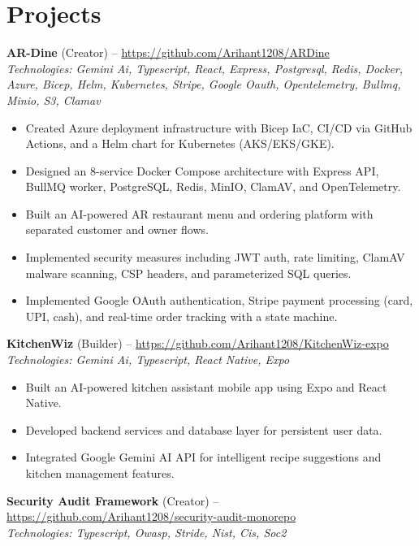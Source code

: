 \documentclass[11pt,a4paper]{article}
\begin{document}
\section{Projects}
\textbf{AR-Dine} (Creator) -- \href{https://github.com/Arihant1208/ARDine}{https://github.com/Arihant1208/ARDine}
\\ \textit{Technologies: Gemini Ai, Typescript, React, Express, Postgresql, Redis, Docker, Azure, Bicep, Helm, Kubernetes, Stripe, Google Oauth, Opentelemetry, Bullmq, Minio, S3, Clamav}
\begin{itemize}
  \item Created Azure deployment infrastructure with Bicep IaC, CI/CD via GitHub Actions, and a Helm chart for Kubernetes (AKS/EKS/GKE).
  \item Designed an 8-service Docker Compose architecture with Express API, BullMQ worker, PostgreSQL, Redis, MinIO, ClamAV, and OpenTelemetry.
  \item Built an AI-powered AR restaurant menu and ordering platform with separated customer and owner flows.
  \item Implemented security measures including JWT auth, rate limiting, ClamAV malware scanning, CSP headers, and parameterized SQL queries.
  \item Implemented Google OAuth authentication, Stripe payment processing (card, UPI, cash), and real-time order tracking with a state machine.
\end{itemize}
\vspace{2pt}
\textbf{KitchenWiz} (Builder) -- \href{https://github.com/Arihant1208/KitchenWiz-expo}{https://github.com/Arihant1208/KitchenWiz-expo}
\\ \textit{Technologies: Gemini Ai, Typescript, React Native, Expo}
\begin{itemize}
  \item Built an AI-powered kitchen assistant mobile app using Expo and React Native.
  \item Developed backend services and database layer for persistent user data.
  \item Integrated Google Gemini AI API for intelligent recipe suggestions and kitchen management features.
\end{itemize}
\vspace{2pt}
\textbf{Security Audit Framework} (Creator) -- \href{https://github.com/Arihant1208/security-audit-monorepo}{https://github.com/Arihant1208/security-audit-monorepo}
\\ \textit{Technologies: Typescript, Owasp, Stride, Nist, Cis, Soc2}
\end{document}
